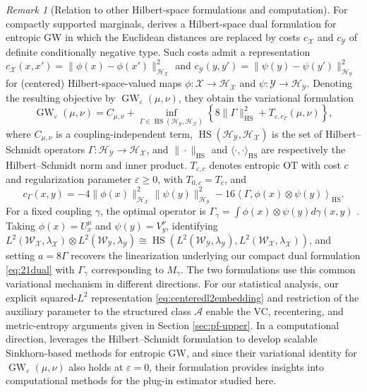 \documentclass[11pt]{amsart}
\theoremstyle{definition}
\theoremstyle{remark}
\newtheorem{remark}[theorem]{Remark}
\newcommand{\1}{\mathbf{1}}
\numberwithin{equation}{section}
\begin{document}
\begin{remark}[Relation to other Hilbert-space formulations and computation]
For compactly supported marginals, \cite{houry2026gromov} derives a Hilbert-space dual formulation for entropic GW in which the Euclidean distances are replaced by costs $c_{\mathcal X}$ and $c_{\mathcal Y}$ of definite conditionally negative type. Such costs admit a representation $c_{\mathcal X}(x,x')=\|\phi(x)-\phi(x')\|_{\mathcal H_{\mathcal X}}^2$ and $c_{\mathcal Y}(y,y')=\|\psi(y)-\psi(y')\|_{\mathcal H_{\mathcal Y}}^2$ for (centered) Hilbert-space-valued maps $\phi:\mathcal X\to\mathcal H_{\mathcal X}$ and $\psi:\mathcal Y\to\mathcal H_{\mathcal Y}$. Denoting the resulting objective by $\operatorname{GW}_{\varepsilon}(\mu,\nu)$, they obtain the variational formulation \cite[Theorem 3.2, Remark C.3]{houry2026gromov}
\[
\operatorname{GW}_{\varepsilon}(\mu,\nu)
=
C_{\mu,\nu}
+
\inf_{\Gamma\in\operatorname{HS}(\mathcal H_{\mathcal Y},\mathcal H_{\mathcal X})}
\left\{
8\|\Gamma\|_{\operatorname{HS}}^2
+
T_{\varepsilon,c_\Gamma}(\mu,\nu)
\right\},
\]
where $C_{\mu,\nu}$ is a coupling-independent term, $\operatorname{HS}(\mathcal H_{\mathcal Y},\mathcal H_{\mathcal X})$ is the set of Hilbert--Schmidt operators $\Gamma: \mathcal H_{\mathcal Y} \to \mathcal H_{\mathcal X}$, and $\|\cdot\|_{\operatorname{HS}}$ and $\langle \cdot, \cdot \rangle_{\operatorname{HS}}$ are respectively the Hilbert--Schmidt norm and inner product. $T_{\varepsilon,c}$ denotes entropic OT with cost $c$ and regularization
parameter $\varepsilon\geq 0$, with $T_{0,c}=T_c$, and 
\[
c_\Gamma(x,y)
=
-4\|\phi(x)\|_{\mathcal H_{\mathcal X}}^2
   \|\psi(y)\|_{\mathcal H_{\mathcal Y}}^2
-16\left\langle
\Gamma,\phi(x)\otimes\psi(y)
\right\rangle_{\operatorname{HS}} .
\]
For a fixed coupling $\gamma$, the optimal operator is $\Gamma_\gamma = \int \phi(x)\otimes\psi(y)d\gamma(x,y)$ \cite[Theorem 3.3]{houry2026gromov}. Taking
$\phi(x)=U_x^\mu$ and $\psi(y)=V_y^\nu$, identifying
$L^2(\mathcal W_{\mathcal X},\lambda_{\mathcal X})\otimes
L^2(\mathcal W_{\mathcal Y},\lambda_{\mathcal Y})
\cong
\operatorname{HS}\left(
L^2(\mathcal W_{\mathcal Y},\lambda_{\mathcal Y}),
L^2(\mathcal W_{\mathcal X},\lambda_{\mathcal X})
\right)$, and setting $a=8\Gamma$ recovers the linearization
underlying our compact dual formulation \eqref{eq:21dual} with $\Gamma_\gamma$ corresponding to $M_\gamma$. The two formulations use this common variational mechanism in different directions. For our statistical analysis, our explicit squared-$L^2$ representation \eqref{eq:centeredl2embedding} and restriction of the auxiliary parameter to the structured class $\mathcal A$ enable the VC, recentering, and metric-entropy arguments given in Section \ref{sec:pf-upper}. In a computational direction,
\cite{houry2026gromov} leverages the Hilbert--Schmidt formulation to
develop scalable Sinkhorn-based methods for entropic GW, and since their variational identity for $\operatorname{GW}_\varepsilon(\mu,\nu)$ also holds at $\varepsilon = 0$, their formulation provides insights into computational methods for the plug-in estimator studied here.
\end{remark}
\end{document}
